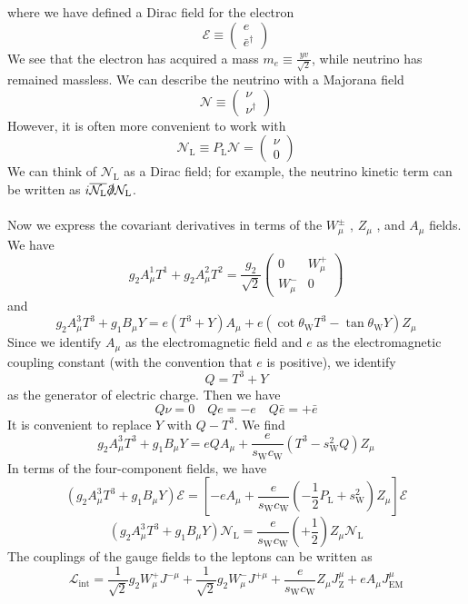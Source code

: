 where we have defined a Dirac field for the electron
\[\mathcal{E} \equiv \begin{pmatrix}
e \\ \bar{e}^{\dagger}
\end{pmatrix} \]
We see that the electron has acquired a mass $m_e \equiv \frac{yv}{\sqrt{2}}$, while neutrino has remained massless.
We can describe the neutrino with a Majorana field
\[\mathcal{N} \equiv \begin{pmatrix}
\nu \\ \nu^{\dagger}
\end{pmatrix}\]
However, it is often more convenient to work with
\[\mathcal{N}_{\mathrm{L}} \equiv P_{\mathrm{L}} \mathcal{N} = \begin{pmatrix}
\nu \\ 0
\end{pmatrix}\]
We can think of $\mathcal{N}_{\mathrm{L}}$ as a Dirac field; for example, the neutrino kinetic term can be written as $i\overline{\mathcal{N}_{\mathrm{L}}} \slashed{\partial} \mathcal{N}_{\mathrm{L}}$.
\\ \\
Now we express the covariant derivatives in terms of the $W_{\mu}^{\pm}$ , $Z_{\mu}$ , and $A_{\mu}$ fields. We have
\[g_2 A^1_{\mu}T^1 + g_2 A^2_{\mu}T^2 = \frac{g_2}{\sqrt{2}} \begin{pmatrix}
0 & W_{\mu}^+ \\ W^{-}_{\mu} & 0
\end{pmatrix} \]
and
\[g_2A^3_{\mu}T^3 + g_1 B_{\mu} Y = e(T^3+Y)A_{\mu} + e(\cot\theta_{\mathrm{W}} T^3 - \tan\theta_{\mathrm{W}} Y)Z_{\mu}\]
Since we identify $A_{\mu}$ as the electromagnetic field and $e$ as the electromagnetic coupling constant (with the convention that $e$ is positive), we identify
\[Q = T^3 + Y\]
as the generator of electric charge. Then we have
\[Q\nu = 0 \quad Qe = -e \quad Q\bar{e} = +\bar{e}\]
It is convenient to replace $Y$ with $Q - T^3$. We find
\[g_2A^3_{\mu}T^3 + g_1 B_{\mu} Y = eQA_{\mu} + \frac{e}{s_{\mathrm{W}} c_{\mathrm{W}}}( T^3 -  s_{\mathrm{W}}^2Q)Z_{\mu}\]
In terms of the four-component fields, we have
\[(g_2A^3_{\mu}T^3 + g_1 B_{\mu} Y) \mathcal{E} = \left[-eA_{\mu} + \frac{e}{s_{\mathrm{W}} c_{\mathrm{W}}}( -\frac{1}{2}P_{\mathrm{L}} +  s_{\mathrm{W}}^2)Z_{\mu} \right] \mathcal{E}\]
\[(g_2A^3_{\mu}T^3 + g_1 B_{\mu} Y) \mathcal{N}_{\mathrm{L}} = \frac{e}{s_{\mathrm{W}} c_{\mathrm{W}}} (+\frac{1}{2}) Z_{\mu}\mathcal{N}_{\mathrm{L}} \]
The couplings of the gauge fields to the leptons can be written as
\[\mathcal{L}_{\mathrm{int}} = \frac{1}{\sqrt{2}}g_2W_{\mu}^{+} J^{-\mu} + \frac{1}{\sqrt{2}}g_2W_{\mu}^{-} J^{+\mu} +  \frac{e}{s_{\mathrm{W}} c_{\mathrm{W}}} Z_{\mu}J_{\mathrm{Z}}^{\mu} + eA_{\mu}J^{\mu}_{\mathrm{EM}}\] 
